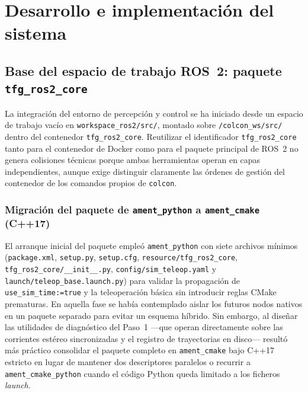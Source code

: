 \chapter{Desarrollo e implementación del sistema}
\label{sec:desarrollo}

\section{Base del espacio de trabajo ROS~2: paquete \texttt{tfg\_ros2\_core}}
\label{sec:tfg_ros2_core}

La integración del entorno de percepción y control se ha iniciado desde un espacio de trabajo vacío en \texttt{workspace\_ros2/src/}, montado sobre \texttt{/colcon\_ws/src/} dentro del contenedor \texttt{tfg\_ros2\_core}. Reutilizar el identificador \texttt{tfg\_ros2\_core} tanto para el contenedor de Docker como para el paquete principal de ROS~2 no genera colisiones técnicas porque ambas herramientas operan en capas independientes, aunque exige distinguir claramente las órdenes de gestión del contenedor de los comandos propios de \texttt{colcon}.

\subsection{Migración del paquete de \texttt{ament\_python} a \texttt{ament\_cmake} (C++17)}
\label{sec:estructura_paquete}

El arranque inicial del paquete empleó \texttt{ament\_python} con siete archivos mínimos (\texttt{package.xml}, \texttt{setup.py}, \texttt{setup.cfg}, \texttt{resource/tfg\_ros2\_core}, \texttt{tfg\_ros2\_core/\_\_init\_\_.py}, \texttt{config/sim\_teleop.yaml} y \texttt{launch/teleop\_base.launch.py}) para validar la propagación de \texttt{use\_sim\_time:=true} y la teleoperación básica sin introducir reglas CMake prematuras. En aquella fase se había contemplado aislar los futuros nodos nativos en un paquete separado para evitar un esquema híbrido. Sin embargo, al diseñar las utilidades de diagnóstico del Paso~1 ---que operan directamente sobre las corrientes estéreo sincronizadas y el registro de trayectorias en disco--- resultó más práctico consolidar el paquete completo en \texttt{ament\_cmake} bajo C++17 estricto en lugar de mantener dos descriptores paralelos o recurrir a \texttt{ament\_cmake\_python} cuando el código Python queda limitado a los ficheros \textit{launch}.

